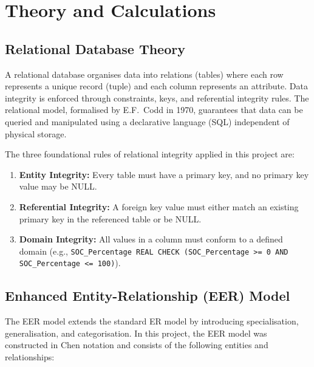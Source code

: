 \documentclass[12pt, a4paper]{report}
\begin{document}
\newpage

\chapter{Theory and Calculations}

\section{Relational Database Theory}
A relational database organises data into relations (tables) where each row represents a unique record (tuple) and each column represents an attribute. Data integrity is enforced through constraints, keys, and referential integrity rules. The relational model, formalised by E.F.~Codd in 1970, guarantees that data can be queried and manipulated using a declarative language (SQL) independent of physical storage.

The three foundational rules of relational integrity applied in this project are:
\begin{enumerate}
    \item \textbf{Entity Integrity:} Every table must have a primary key, and no primary key value may be NULL.
    \item \textbf{Referential Integrity:} A foreign key value must either match an existing primary key in the referenced table or be NULL.
    \item \textbf{Domain Integrity:} All values in a column must conform to a defined domain (e.g., \texttt{SOC\_Percentage REAL CHECK (SOC\_Percentage >= 0 AND SOC\_Percentage <= 100)}).
\end{enumerate}

\section{Enhanced Entity-Relationship (EER) Model}
The EER model extends the standard ER model by introducing specialisation, generalisation, and categorisation. In this project, the EER model was constructed in Chen notation and consists of the following entities and relationships:
\end{document}
